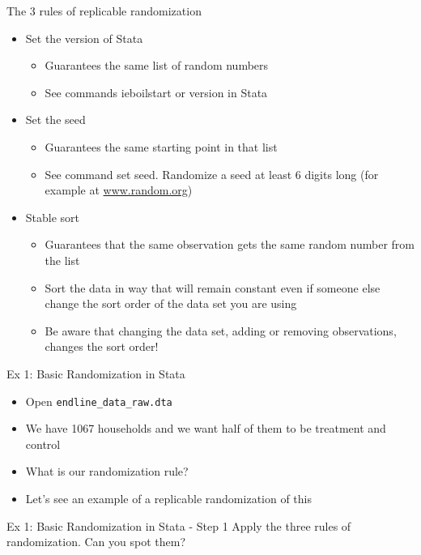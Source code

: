 \documentclass[aspectratio=169]{beamer}
\newcommand{\codeexample}[2]{
	\begin{figure}
		\VerbatimInput[
		framesep=3mm,
		frame=lines, %
		numbers=left, %
		label= #1, %
		baselinestretch=0.90, %
		]{#2} %
	\end{figure}
	\FloatBarrier
}
\begin{document}
\begin{frame}{The 3 rules of replicable randomization}
	\begin{itemize}
		\item Set the version of Stata
		\begin{itemize}
			\item Guarantees the same list of random numbers
			\item See commands ieboilstart or version in Stata
		\end{itemize}
		\item Set the seed 
		\begin{itemize}
			\item 	Guarantees the same starting point in that list
			\item See command set seed. Randomize a seed at least 6 digits long (for example at \url{www.random.org})
		\end{itemize}
		\item Stable sort
		\begin{itemize}
			\item Guarantees that the same observation gets the same random number from the list
			\item Sort the data in way that will remain constant even if someone else change the sort order of the data set you are using
			\item Be aware that changing the data set, adding or removing observations, changes the sort order!
		\end{itemize}
	\end{itemize}
\end{frame}



\begin{frame}{Ex 1: Basic Randomization in Stata}
	\begin{itemize}
		\item Open \texttt{endline\_data\_raw.dta}
		\item We have 1067 households and we want half of them to be treatment and control
		\item What is our randomization rule?
		\item Let’s see an example of a replicable randomization of this
	\end{itemize}
\end{frame}


\begin{frame}{Ex 1: Basic Randomization in Stata - Step 1}
	Apply the three rules of randomization. Can you spot them?
	\codeexample{randomization-1.do}{code/randomization-1.do}
\end{frame}
\end{document}
